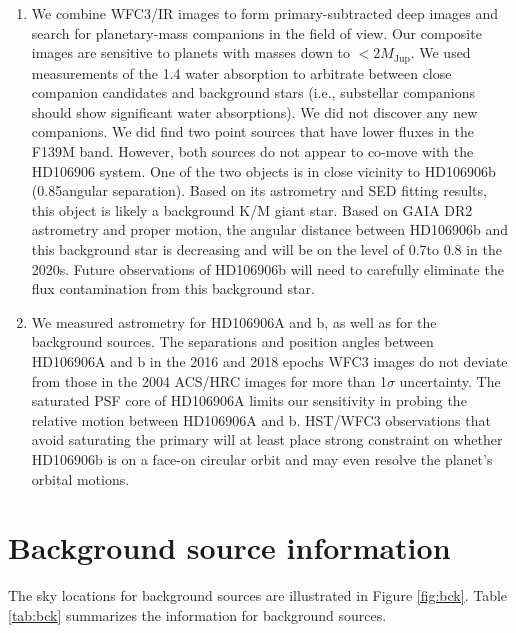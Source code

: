 \documentclass[twocolumn, trackchanges]{aastex62}
\newcommand{\mjup}{\ensuremath{M_\mathrm{Jup}}\xspace}
\begin{document}
\begin{enumerate}
\item We combine WFC3/IR images to form primary-subtracted deep images and search for planetary-mass companions in the field of view. Our composite images are sensitive to planets with masses down to $< 2 \mjup$. We used measurements of the 1.4\micron{} water absorption to {arbitrate between close companion candidates and background stars} (i.e., substellar companions should show significant water absorptions). We did not discover  any new companions. We did find two point sources that have lower fluxes in the F139M band. However, both sources do not appear to co-move with the HD106906 system. One of the two objects is in close vicinity to HD106906b (0.85\arcsec angular separation). Based on its astrometry and SED fitting results, this object is likely a background K/M giant star.  Based on GAIA DR2 astrometry and proper motion, the angular distance between HD106906b and this background star is decreasing and will be on the level of 0.7\arcsec to 0.8\arcsec{}  in the 2020s. Future observations of HD106906b will need to  carefully eliminate the flux contamination from this background star.

\item We measured astrometry for HD106906A and b, as well as for the background sources. The separations and position angles between HD106906A and b in the 2016 and 2018 epochs WFC3 images do not deviate from  those in the 2004 ACS/HRC images for more than 1$\sigma$ uncertainty. The saturated PSF core of  HD106906A limits our sensitivity in probing the relative motion between HD106906A and b. HST/WFC3 observations that avoid saturating the primary will at least place strong constraint on whether HD106906b is on a face-on circular orbit and may even resolve the planet's orbital motions.
\end{enumerate}





\appendix
\section{Background source information}

The sky locations for background sources are illustrated in Figure \ref{fig:bck}. Table \ref{tab:bck} summarizes the information for background sources.
\end{document}

